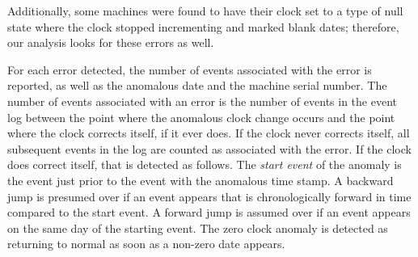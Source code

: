 Additionally, some machines were found to have their clock set to
a type of null state where the clock stopped incrementing and marked blank
dates; therefore, our analysis looks for these errors as well.

For each error detected, the number of events associated with the error
is reported, as well as the anomalous date and the machine serial
number. The number of events associated with an error is the number
of events in the event log between the point where the anomalous clock
change occurs and the point where the clock corrects itself, if it ever
does. If the clock never corrects itself, all subsequent events in the
log are counted as associated with the error. If the clock
does correct itself, that is detected as follows. The \emph{start
event} of the anomaly is the event just prior to the event with the
anomalous time stamp.
A backward jump is presumed over if an event
appears that is chronologically forward in time compared to the start event.
A forward jump is assumed over if an event appears on the same day of the
starting event.  The zero clock anomaly is detected as returning to normal as
soon as a non-zero date appears.

